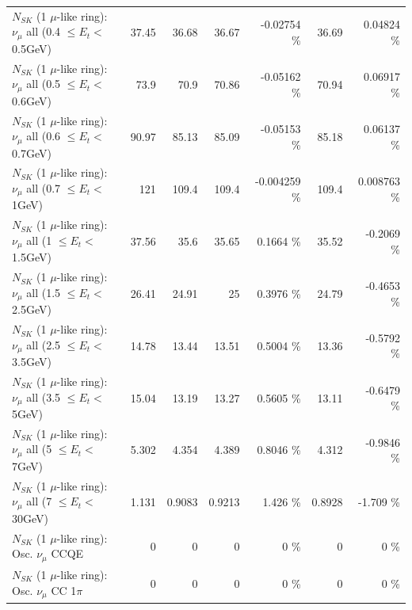 \begin{table}
\begin{tabular}{| l | r | r | r  r | r  r |}
       $N_{SK}$ (1 $\mu$-like ring): $\nu_{\mu}$ all (0.4 $\leq E_{t} <$ 0.5GeV) &           37.45 &           36.68 &           36.67 & -0.02754 \%  &           36.69 &  0.04824 \%  \\ 
       $N_{SK}$ (1 $\mu$-like ring): $\nu_{\mu}$ all (0.5 $\leq E_{t} <$ 0.6GeV) &            73.9 &            70.9 &           70.86 & -0.05162 \%  &           70.94 &  0.06917 \%  \\ 
       $N_{SK}$ (1 $\mu$-like ring): $\nu_{\mu}$ all (0.6 $\leq E_{t} <$ 0.7GeV) &           90.97 &           85.13 &           85.09 & -0.05153 \%  &           85.18 &  0.06137 \%  \\ 
         $N_{SK}$ (1 $\mu$-like ring): $\nu_{\mu}$ all (0.7 $\leq E_{t} <$ 1GeV) &             121 &           109.4 &           109.4 & -0.004259 \%  &           109.4 & 0.008763 \%  \\ 
         $N_{SK}$ (1 $\mu$-like ring): $\nu_{\mu}$ all (1 $\leq E_{t} <$ 1.5GeV) &           37.56 &            35.6 &           35.65 &   0.1664 \%  &           35.52 &  -0.2069 \%  \\ 
       $N_{SK}$ (1 $\mu$-like ring): $\nu_{\mu}$ all (1.5 $\leq E_{t} <$ 2.5GeV) &           26.41 &           24.91 &              25 &   0.3976 \%  &           24.79 &  -0.4653 \%  \\ 
       $N_{SK}$ (1 $\mu$-like ring): $\nu_{\mu}$ all (2.5 $\leq E_{t} <$ 3.5GeV) &           14.78 &           13.44 &           13.51 &   0.5004 \%  &           13.36 &  -0.5792 \%  \\ 
         $N_{SK}$ (1 $\mu$-like ring): $\nu_{\mu}$ all (3.5 $\leq E_{t} <$ 5GeV) &           15.04 &           13.19 &           13.27 &   0.5605 \%  &           13.11 &  -0.6479 \%  \\ 
           $N_{SK}$ (1 $\mu$-like ring): $\nu_{\mu}$ all (5 $\leq E_{t} <$ 7GeV) &           5.302 &           4.354 &           4.389 &   0.8046 \%  &           4.312 &  -0.9846 \%  \\ 
          $N_{SK}$ (1 $\mu$-like ring): $\nu_{\mu}$ all (7 $\leq E_{t} <$ 30GeV) &           1.131 &          0.9083 &          0.9213 &    1.426 \%  &          0.8928 &   -1.709 \%  \\ 
\hline
\hline
                               $N_{SK}$ (1 $\mu$-like ring): Osc. $\nu_\mu$ CCQE &               0 &               0 &               0 &        0 \%  &               0 &        0 \%  \\ 
                          $N_{SK}$ (1 $\mu$-like ring): Osc. $\nu_\mu$ CC 1$\pi$ &               0 &               0 &               0 &        0 \%  &               0 &        0 \%  \\ 

\end{tabular}
\end{table}
